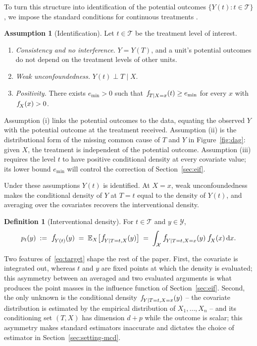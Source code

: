 \documentclass[11pt]{article}
\theoremstyle{plain}
\theoremstyle{definition}
\newtheorem{mydef}{Definition}
\newtheorem{assumption}{Assumption}
\theoremstyle{remark}
\newcommand{\pE}{\ensuremath{\mathbb{E}}}
\newcommand{\cX}{\ensuremath{\mathcal{X}}}
\newcommand{\cY}{\ensuremath{\mathcal{Y}}}
\newcommand{\cT}{\ensuremath{\mathcal{T}}}
\newcommand{\pf}[1]{\ensuremath{\,\mathlarger{\textit{f}}_{#1}}}
\newcommand{\dd}{\,\mathrm{d}}
\newcommand{\gps}{e}
\begin{document}
To turn this structure into identification of the potential outcomes
$\{Y(t) : t \in \cT\}$, we impose the standard conditions for continuous treatments
\citep{imbens2000,hirano2004}.

\begin{assumption}[Identification]
\label{as:identification}
Let $t \in \cT$ be the treatment level of interest.
\begin{enumerate}
\item[(i)] \emph{Consistency and no interference.} $Y = Y(T)$, and a unit's potential
outcomes do not depend on the treatment levels of other units.
\item[(ii)] \emph{Weak unconfoundedness.} $Y(t) \perp T \mid X$.
\item[(iii)] \emph{Positivity.} There exists $\gps_{\min} > 0$ such that
$\pf{T \mid X=x}(t) \ge \gps_{\min}$ for every $x$ with $\pf{X}(x) > 0$.
\end{enumerate}
\end{assumption}

Assumption (i) links the potential outcomes to the data, equating the observed $Y$ with
the potential outcome at the treatment received. Assumption (ii) is the distributional
form of the missing common cause of $T$ and $Y$ in Figure~\ref{fig:dag}: given $X$, the
treatment is independent of the potential outcome. Assumption (iii) requires the level $t$
to have positive conditional density at every covariate value; its lower bound
$\gps_{\min}$ will control the correction of Section~\ref{sec:eif}.

Under these assumptions $Y(t)$ is identified. At $X=x$, weak unconfoundedness makes the
conditional density of $Y$ at $T=t$ equal to the density of $Y(t)$, and averaging over the
covariates recovers the interventional density.

\begin{mydef}[Interventional density]
\label{def:target}
For $t \in \cT$ and $y \in \cY$,
\begin{equation}
p_t(y) \;:=\; \pf{Y(t)}(y) \;=\; \pE_X\big[\pf{Y \mid T=t,X}(y)\big]
\;=\; \int_{\cX} \pf{Y \mid T=t,X=x}(y)\,\pf{X}(x) \dd x .
\label{eq:target}
\end{equation}
\end{mydef}

Two features of~\eqref{eq:target} shape the rest of the paper. First, the covariate is
integrated out, whereas $t$ and $y$ are fixed points at which the density is evaluated;
this asymmetry between an averaged and two evaluated arguments is what produces the point
masses in the influence function of Section~\ref{sec:eif}. Second, the only unknown is the
conditional density $\pf{Y \mid T=t,X=x}(y)$ -- the covariate distribution is estimated by
the empirical distribution of $X_1,\dots,X_n$ -- and its conditioning set $(T,X)$ has
dimension $d+p$ while the outcome is scalar; this asymmetry makes standard estimators
inaccurate and dictates the choice of estimator in Section~\ref{sec:setting-mcd}.
\end{document}
